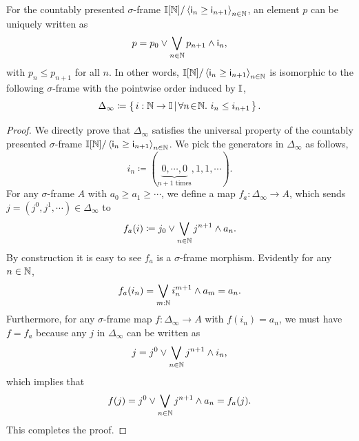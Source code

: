 \begin{lemma}\label{app:normalsigma}
  For the countably presented $\sigma$-frame $\mathbb{I}[\mathbb{N}]/\left\langle\mathsf{i}_n \ge \mathsf{i}_{n+1}\right\rangle_{n\in\mathbb{N}}$, an element $p$ can be uniquely written as 
  \[ p = p_0 \vee \bigvee_{n\in\mathbb{N}} p_{n+1} \wedge \mathsf{i}_n\text{,} \]
  with $p_n \le p_{n+1}$ for all $n$. In other words, $\mathbb{I}[\mathbb{N}]/\left\langle\mathsf{i}_n \ge \mathsf{i}_{n+1}\right\rangle_{n\in\mathbb{N}}$ is isomorphic to the following $\sigma$-frame with the pointwise order induced by $\mathbb{I}$,
  \[ \Delta_\infty \coloneq \left\{\,i : \mathbb{N} \to \mathbb{I}\,\middle|\,\forall n\!\in\!\mathbb{N}.\  i_n \le i_{n+1}\,\right\}\text{.} \]
\end{lemma}
\begin{proof}
  We directly prove that $\Delta_\infty$ satisfies the universal property of the countably presented $\sigma$-frame $\mathbb{I}[\mathbb{N}]/\left\langle\mathsf{i}_n \ge \mathsf{i}_{n+1}\right\rangle_{n\in\mathbb{N}}$. We pick the generators in $\Delta_\infty$ as follows,
  \[ i_n \coloneq (\underbrace{0,\cdots,0}_{n+1 \text{ times}},1,1,\cdots)\text{.} \]
  For any $\sigma$-frame $A$ with $a_0 \ge a_1 \ge \cdots$, we define a map $f_a \colon \Delta_\infty \to A$, which sends $j = (j^0,j^1,\cdots) \in \Delta_\infty$ to
  \[ f_a(i) \coloneq j_0 \vee \bigvee_{n\in\mathbb{N}} j^{n+1} \wedge a_{n}\text{.} \]
  By construction it is easy to see $f_a$ is a $\sigma$-frame morphism. Evidently for any $n\in\mathbb{N}$, 
  \[ f_a(i_n) = \bigvee_{m:\mathbb{N}} i_n^{m+1} \wedge a_m = a_n\text{.} \]
  Furthermore, for any $\sigma$-frame map $f \colon \Delta_\infty \to A$ with $f(i_n) = a_n$, we must have $f = f_a$ because any $j$ in $\Delta_\infty$ can be written as
  \[ j = j^0 \vee \bigvee_{n\in\mathbb{N}} j^{n+1} \wedge i_n\text{,} \]
  which implies that
  \[ f(j) = j^0 \vee \bigvee_{n\in\mathbb{N}}j^{n+1} \wedge a_n = f_a(j)\text{.} \]
  This completes the proof.
\end{proof}


